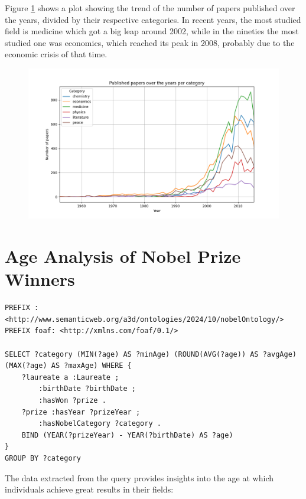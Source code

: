 \documentclass{article}
\begin{document}
\noindent Figure \ref{fig:papersPerCategory} shows a plot showing the trend of the number of papers published over the years, divided by their respective categories.
In recent years, the most studied field is medicine which got a big leap around 2002, while in the nineties the most studied one was economics, which
reached its peak in 2008, probably due to the economic crisis of that time.
\begin{figure}[ht]
	\label{fig:papersPerCategory}
	\centering
	\includegraphics[width=\textwidth]{../queries/plots/papersPerCategory.png}
\end{figure}

\newpage

\section{Age Analysis of Nobel Prize Winners} \label{winners age}
\begin{lstlisting}
PREFIX : <http://www.semanticweb.org/a3d/ontologies/2024/10/nobelOntology/>
PREFIX foaf: <http://xmlns.com/foaf/0.1/>

SELECT ?category (MIN(?age) AS ?minAge) (ROUND(AVG(?age)) AS ?avgAge) (MAX(?age) AS ?maxAge) WHERE {
    ?laureate a :Laureate ;
        :birthDate ?birthDate ;
        :hasWon ?prize .
    ?prize :hasYear ?prizeYear ;
        :hasNobelCategory ?category .
    BIND (YEAR(?prizeYear) - YEAR(?birthDate) AS ?age)
}
GROUP BY ?category
\end{lstlisting}

The data extracted from the query provides insights into the age at which individuals achieve great results in
their fields:
\end{document}
